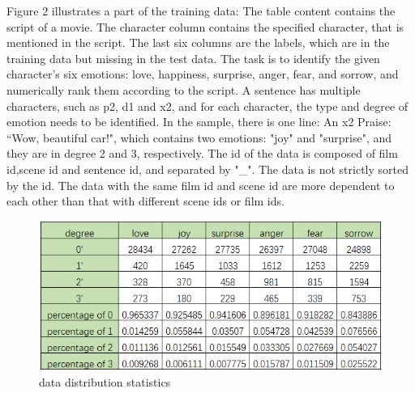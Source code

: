 \documentclass[12pt,twocolumn,letterpaper]{article}
\begin{document}
 Figure 2 illustrates a part of the training data: The table content contains the script of a movie. The character column contains the specified character, that is mentioned in the script. The last six columns are the labels, which are in the training data but missing in the test data. The task is to identify the given character’s six emotions: love, happiness, surprise, anger, fear, and sorrow, and numerically rank them according to the script. A sentence has multiple characters, such as p2, d1 and x2, and for each character, the type and degree of emotion needs to be identified. In the sample, there is one line: An x2 Praise: “Wow, beautiful car!", which contains two emotions: "joy" and "surprise", and they are in degree 2 and 3, respectively. The id of the data is composed of film id,scene id and sentence id, and separated by "\_". The data is not strictly sorted by the id. The data with the same film id and scene id are more dependent to each other than that with different scene ids or film ids.
\begin{figure}
\begin{center}
\includegraphics[scale=0.6]{data distribution.png}
\end{center}
   \caption{data distribution statistics}
\label{fig:short}
\end{figure}
\end{document}
